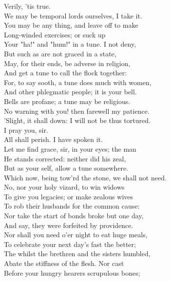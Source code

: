 \documentclass[a4paper,oneside]{memoir}
\begin{document}
\begin{drama*}
\tribulationspeaks {} Verily, 'tis true.\\
We may be temporal lords ourselves, I take it.\\
\subtlespeaks You may be any thing, and leave off to make\\
Long-winded exercises; or suck up\\
Your "ha!" and "hum!" in a tune. I not deny,\\
But such as are not graced in a state,\\
May, for their ends, be adverse in religion,\\
And get a tune to call the flock together:\\
For, to say sooth, a tune does much with women,\\
And other phlegmatic people; it is your bell.\\
\ananiasspeaks Bells are profane; a tune may be religious.\\
\subtlespeaks No warning with you! then farewell my patience.\\
'Slight, it shall down: I will not be thus tortured.\\
\tribulationspeaks I pray you, sir.\\
\subtlespeaks {} All shall perish. I have spoken it.\\
\tribulationspeaks Let me find grace, sir, in your eyes; the man\\
He stands corrected: neither did his zeal,\\
But as your self, allow a tune somewhere.\\
Which now, being tow'rd the stone, we shall not need.\\
\subtlespeaks No, nor your holy vizard, to win widows\\
To give you legacies; or make zealous wives\\
To rob their husbands for the common cause:\\
Nor take the start of bonds broke but one day,\\
And say, they were forfeited by providence.\\
Nor shall you need o'er night to eat huge meals,\\
To celebrate your next day's fast the better;\\
The whilst the brethren and the sisters humbled,\\
Abate the stiffness of the flesh. Nor cast\\
Before your hungry hearers scrupulous bones;\\

\end{drama*}
\end{document}
